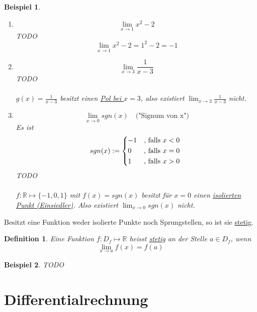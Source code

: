 \documentclass{report}
\newtheorem{mydef}{Definition}
\newtheorem{myexample}{Beispiel}
\begin{document}
\begin{myexample}\begin{enumerate}
\item \begin{equation}\lim_{x \to 1} x^2-2\end{equation}
TODO
\begin{equation}\lim_{x \to 1} x^2-2 = 1^2 -2 = -1\end{equation}
\item \begin{equation}\lim_{x \to 3} \frac{1}{x-3}\end{equation}
TODO\\\\
$g(x) = \frac{1}{x-3}$ besitzt einen \underline{Pol bei $x = 3$}, also existiert $\lim_{x \to 3} \frac{1}{x-3}$ nicht.
\item \begin{equation}\lim_{x \to 0} sgn(x) \quad \mbox{("Signum von x")}\end{equation}Es ist
\[
 sgn(x) := \begin{dcases*}
        -1  &, falls $x < 0$\\
        0 &, falls $x = 0$\\
	1 & , falls $x > 0$
        \end{dcases*}
\]
TODO\\\\
$f: \mathbb{R} \mapsto \{ -1, 0, 1\}$ mit $f(x) = sgn(x)$ besitzt für $x=0$ einen \underline{isolierten Punkt (Einsiedler)}. Also existiert $\lim_{x \to 0} sgn(x)$ nicht.
\end{enumerate}\end{myexample}
Besitzt eine Funktion weder isolierte Punkte noch Sprungstellen, so ist sie \underline{stetig}.
\begin{mydef}Eine Funktion $f: D_f \mapsto \mathbb{R}$ heisst \underline{stetig} an der Stelle $a \in D_f$, wenn
\begin{equation}\lim_{x \to a} f(x) = f(a)\end{equation}
\end{mydef}
\begin{myexample}TODO\end{myexample}

\chapter{Differentialrechnung}
\end{document}
